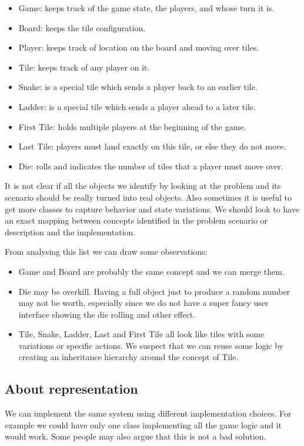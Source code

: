 \documentclass[10pt,twoside,english]{_support/latex/sbabook/sbabook}
\begin{document}
\begin{itemize}
\item Game: keeps track of the game state, the players, and whose turn it is.
\item Board: keeps the tile configuration. 
\item Player:  keeps track of location on the board and moving over tiles.
\item Tile: keeps track of any player on it. 
\item Snake: is a special tile which sends a player back to an earlier tile.
\item Ladder: is a special tile which sends a player ahead to a later tile.
\item First Tile: holds multiple players at the beginning of the game.
\item Last Tile: players must land exactly on this tile, or else they do not move.
\item Die: rolls and indicates the number of tiles that a player must move over.
\end{itemize}

It is not clear if all the objects we identify by looking at the problem and its scenario should be really turned into real objects. Also sometimes it is useful to get more classes to capture behavior and state variations. We should look to have an exact mapping between concepts identified in the problem scenario or description and the implementation. 

From analysing this list we can draw some observations: 

\begin{itemize}
\item Game and Board are probably the same concept and we can merge them.
\item Die may be overkill. Having a full object just to produce a random number may not be worth, especially since we do not have a super fancy user interface showing the die rolling and other effect. 
\item Tile, Snake, Ladder, Last and First Tile all look like tiles with some variations or specific actions. We suspect that we can reuse some logic by creating an inheritance hierarchy around the concept of Tile. 
\end{itemize}
\subsection{About representation }
We can implement the same system using different implementation choices. For example we could have only one class implementing all the game logic and it would work. Some people may also 
argue that this is not a bad solution.
\end{document}

